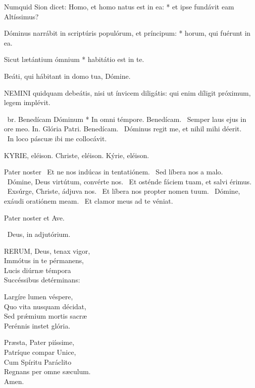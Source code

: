 Numquid Sion dicet: Homo, et homo natus est in ea: * et ipse fundávit eam Altíssimus?

Dóminus narrábit in scriptúris populórum, et príncipum: * horum, qui fuérunt in ea.

Sicut lætántium ómnium * habitátio est in te.

 Beáti, qui hábitant in domo tua, Dómine.



\lettrine[lines=2]{N}{EMINI} quidquam debeátis, nisi ut ínvicem diligátis: qui enim díligit próximum, legem implévit.

\R\ br. Benedícam Dóminum * In omni témpore. Benedícam. \V\ Semper laus ejus in ore meo. In. Glória Patri. Benedícam. \V\ Dóminus regit me, et nihil mihi déerit. \R\ In loco páscuæ ibi me collocávit.



KYRIE, eléison. Christe, eléison. Kýrie, eléison.

Pater noster  \V\ Et ne nos indúcas in tentatiónem. \R\ Sed líbera nos a malo. \V\ Dómine, Deus virtútum, convérte nos. \R\ Et osténde fáciem tuam, et salvi érimus. \V\ Exsúrge, Christe, ádjuva nos. \R\ Et líbera nos propter nomen tuum. \V\ Dómine, exáudi oratiónem meam. \R\ Et clamor meus ad te véniat.



Pater noster et Ave.

\V\ Deus, in adjutórium.


\lettrine[lines=2]{R}{ERUM}, Deus, tenax vigor,\\
Immótus in te pérmanens,\\
Lucis diúrnæ témpora\\
Succéssibus detérminans:

Largíre lumen véspere,\\
Quo vita nusquam décidat,\\
Sed prǽmium mortis sacræ\\
Perénnis instet glória.

Præsta, Pater piíssime,\\
Patríque compar Unice,\\
Cum Spíritu Paráclito\\
Regnans per omne sæculum.\\
Amen.


